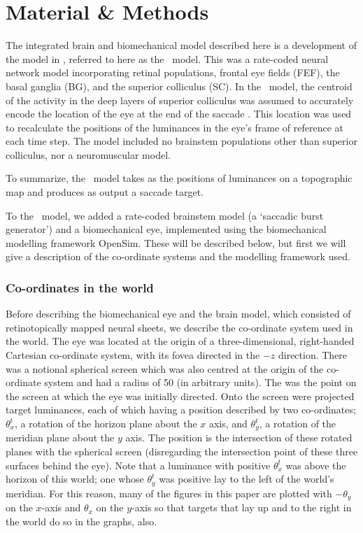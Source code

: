 \section{Material \& Methods}

The integrated brain and biomechanical model described here is a
development of the model in \cite{cope_basal_2017},
referred to here as the \ccg~model. This was a rate-coded neural
network model incorporating retinal populations, frontal eye fields
(FEF), the basal ganglia (BG), and the superior colliculus (SC). In
the \ccg~model, the centroid of the activity in the deep
layers of superior colliculus was assumed to accurately encode the
location of the eye at the end of the
saccade \citep{wurtz_activity_1972,robinson_eye_1972,van_gisbergen_collicular_1987,mcilwain_lateral_1982}.
This location was used to recalculate the positions of the luminances in
the eye's frame of reference at each time step. The model included no
brainstem populations other than superior colliculus, nor a
neuromuscular model.

To summarize, the \ccg~model takes as  the positions
of luminances on a topographic map and produces as output a saccade
target.

To the \ccg~model, we added a rate-coded brainstem model (a `saccadic
burst generator') and a biomechanical eye, implemented using the
biomechanical modelling framework OpenSim.
These will be described below, but first we will give a description of
the co-ordinate systems and the modelling framework used.

\subsubsection{Co-ordinates in the world}

Before describing the biomechanical eye and the brain model, which consisted
of retinotopically mapped neural sheets, we describe the co-ordinate system
used in the world. The eye was located at the origin of a three-dimensional, right-handed
Cartesian co-ordinate system, with its fovea directed in the $-z$ direction.
There was a notional spherical screen which was also centred at the origin of the
co-ordinate system and had a radius of 50 (in arbitrary units). The  was the point on the
screen at which the eye was initially directed.
Onto the screen were projected target luminances, each of which having a position
described by two co-ordinates; $\theta_{x}^{t}$, a
rotation of the horizon plane about the $x$ axis, and $\theta_{y}^{t}$, a rotation
of the meridian plane about the $y$ axis. The position is the intersection
of these rotated planes with the spherical screen (disregarding
the intersection point of these three surfaces behind the eye).
%
Note that a luminance with positive $\theta_{x}^{t}$ was above the horizon of this world;
one whose $\theta_{y}^{t}$ was positive lay to the left of the world's meridian. For this
reason, many of the figures in this paper are plotted with $-\theta_{y}$ on the
$x$-axis and $\theta_{x}$ on the $y$-axis so that targets that lay up and to the right
in the world do so in the graphs, also.

